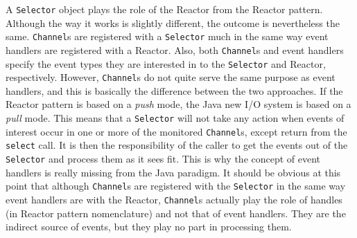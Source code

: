 \documentclass[a4paper,10pt]{article}
\begin{document}
A \texttt{Selector} object plays the role of the Reactor from the Reactor pattern. Although the way it works is slightly
different, the outcome is nevertheless the same. \texttt{Channel}s are registered with a \texttt{Selector} much in the
same way event handlers are registered with a Reactor. Also, both \texttt{Channel}s and event handlers specify the
event types they are interested in to the \texttt{Selector} and Reactor, respectively. However, \texttt{Channel}s do
not quite serve the same purpose as event handlers, and this is basically the difference between the two approaches. If
the Reactor pattern is based on a \textit{push} mode, the Java new I/O system is based on a \textit{pull} mode. This
means that a \texttt{Selector} will not take any action when events of interest occur in one or more of the monitored
\texttt{Channel}s, except return from the \texttt{select} call. It is then the responsibility of the caller to get the events
out of the \texttt{Selector} and process them as it sees fit. This is why the concept of event handlers is really missing
from the Java paradigm. It should be obvious at this point that although \texttt{Channel}s are registered with the
\texttt{Selector} in the same way event handlers are with the Reactor, \texttt{Channel}s actually play the role
of handles (in Reactor pattern nomenclature) and not that of event handlers. They are the indirect source of events,
but they play no part in processing them.
\end{document}
